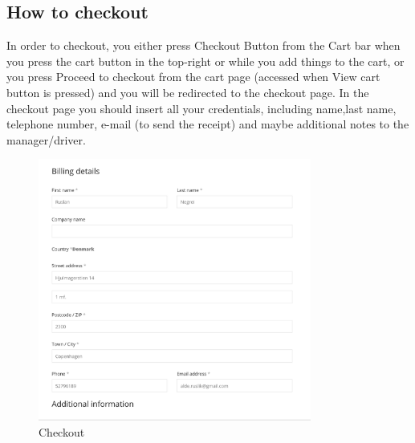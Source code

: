 \documentclass[12p]{article}
\begin{document}
\subsection{How to checkout}
In order to checkout, you either press Checkout Button from the Cart bar when you press the cart button in the top-right or while you add things to the cart, or you press Proceed to checkout from the cart page (accessed when View cart button is pressed) and you will be redirected to the checkout page. In the checkout page you should insert all your credentials, including name,last name, telephone number, e-mail (to send the receipt) and maybe additional notes to the manager/driver. 
\\
\begin{figure}[ht]
    \centering
    \includegraphics[width=0.8\textwidth]{10.png}
    \caption{Checkout}
    \label{fig:wordpress_checkout}
\end{figure}
\\
\newpage
\end{document}
